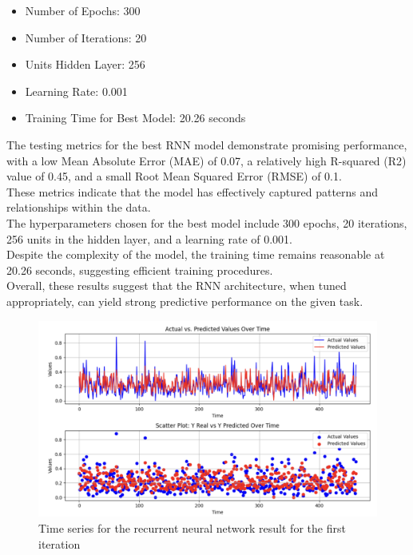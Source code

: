 \documentclass[10pt]{article} %
\begin{document}
    \begin{itemize}
        \item Number of Epochs: 300
        \item Number of Iterations: 20
        \item Units Hidden Layer: 256
        \item Learning Rate: 0.001
        \item Training Time for Best Model: 20.26 seconds
    \end{itemize}
    The testing metrics for the best RNN model demonstrate promising performance, with a low Mean Absolute Error (MAE) of 0.07, a relatively high R-squared (R2) value of 0.45, and a small Root Mean Squared Error (RMSE) of 0.1.
    \\These metrics indicate that the model has effectively captured patterns and relationships within the data.
    \\The hyperparameters chosen for the best model include 300 epochs, 20 iterations, 256 units in the hidden layer, and a learning rate of 0.001.
    \\Despite the complexity of the model, the training time remains reasonable at 20.26 seconds, suggesting efficient training procedures.
    \\Overall, these results suggest that the RNN architecture, when tuned appropriately, can yield strong predictive performance on the given task.
    
    \begin{figure}
        \centering
        \includegraphics[scale = 0.4]{Assets/iteration 1/lstm_it1_1.png}
        \caption{Time series for the recurrent neural network result for the first iteration}
        \label{fig:enter-label}
    \end{figure}
    
\end{document}
